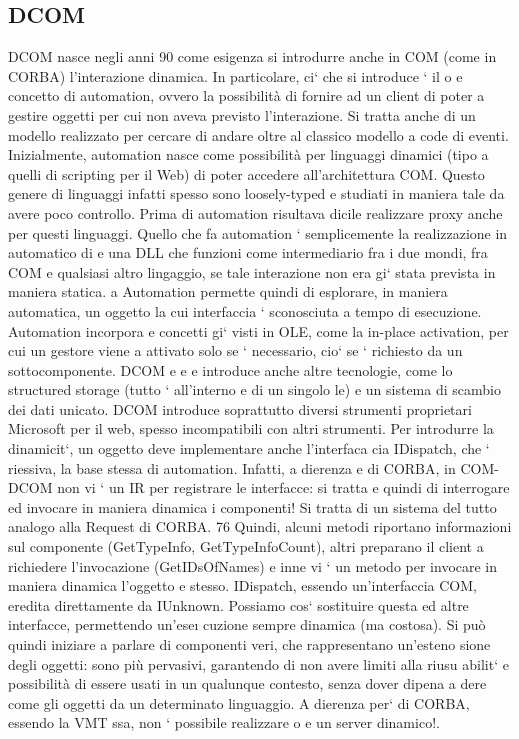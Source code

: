 \documentclass[a4paper,12pt]{article}
\begin{document}
\subsection{DCOM}
DCOM nasce negli anni 90 come esigenza si introdurre anche in COM (come
in CORBA) l'interazione dinamica. In particolare, ci` che si introduce ` il
o
e
concetto di automation, ovvero la possibilità di fornire ad un client di poter
a
gestire oggetti per cui non aveva previsto l'interazione. Si tratta anche di un
modello realizzato per cercare di andare oltre al classico modello a code di eventi.
Inizialmente, automation nasce come possibilità per linguaggi dinamici (tipo
a
quelli di scripting per il Web) di poter accedere all'architettura COM. Questo
genere di linguaggi infatti spesso sono loosely-typed e studiati in maniera tale
da avere poco controllo. Prima di automation risultava dicile realizzare proxy
anche per questi linguaggi.
Quello che fa automation ` semplicemente la realizzazione in automatico di
e
una DLL che funzioni come intermediario fra i due mondi, fra COM e qualsiasi
altro lingaggio, se tale interazione non era gi` stata prevista in maniera statica.
a
Automation permette quindi di esplorare, in maniera automatica, un oggetto
la cui interfaccia ` sconosciuta a tempo di esecuzione. Automation incorpora
e
concetti gi` visti in OLE, come la in-place activation, per cui un gestore viene
a
attivato solo se ` necessario, cio` se ` richiesto da un sottocomponente. DCOM
e
e e
introduce anche altre tecnologie, come lo structured storage (tutto ` all'interno
e
di un singolo le) e un sistema di scambio dei dati unicato. DCOM introduce
soprattutto diversi strumenti proprietari Microsoft per il web, spesso incompatibili con altri strumenti.
Per introdurre la dinamicit`, un oggetto deve implementare anche l'interfaca
cia IDispatch, che ` riessiva, la base stessa di automation. Infatti, a dierenza
e
di CORBA, in COM-DCOM non vi ` un IR per registrare le interfacce: si tratta
e
quindi di interrogare ed invocare in maniera dinamica i componenti! Si tratta
di un sistema del tutto analogo alla Request di CORBA.
76
Quindi, alcuni metodi riportano informazioni sul componente (GetTypeInfo,
GetTypeInfoCount), altri preparano il client a richiedere l'invocazione (GetIDsOfNames) e inne vi ` un metodo per
invocare in maniera dinamica l'oggetto
e
stesso. IDispatch, essendo un'interfaccia COM, eredita direttamente da IUnknown. Possiamo cos` sostituire questa ed
altre interfacce, permettendo un'ese\i{}
cuzione sempre dinamica (ma costosa).
Si può quindi iniziare a parlare di componenti veri, che rappresentano un'esteno
sione degli oggetti: sono più pervasivi, garantendo di non avere limiti alla riusu
abilit` e possibilità di essere usati in un qualunque contesto, senza dover dipena
a
dere come gli oggetti da un determinato linguaggio.
A dierenza per` di CORBA, essendo la VMT ssa, non ` possibile realizzare
o
e
un server dinamico!.
\end{document}
